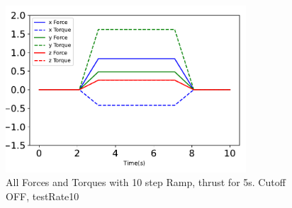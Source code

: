 \begin{figure}[htbp]\centerline{\includegraphics[width=0.8\textwidth]{AutoTeX/Ramp_10steps_CutoffOFF_5s_testRate10}}\caption{All Forces and Torques with 10 step Ramp, thrust for 5s. Cutoff OFF, testRate10}\label{fig:Ramp_10steps_CutoffOFF_5s_testRate10}\end{figure}